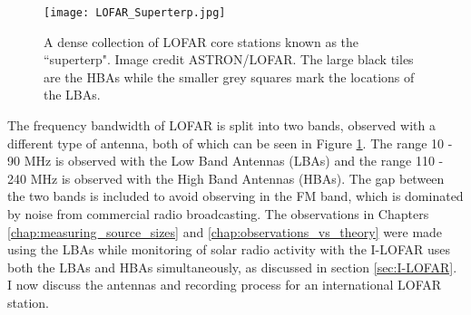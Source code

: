  
\begin{figure}[ht]
\centering
\texttt{[image: LOFAR\_Superterp.jpg]}
\caption[The LOFAR superterp]{A dense collection of LOFAR core stations known as the ``superterp". Image credit ASTRON/LOFAR. The large black tiles are the HBAs while the smaller grey squares mark the locations of the LBAs.}
\label{fig:superterp}
\end{figure}

The frequency bandwidth of LOFAR is split into two bands, observed with a different type of antenna, both of which can be seen in Figure \ref{fig:superterp}. The range 10 - 90 MHz is observed with the Low Band Antennas (LBAs) and the range 110 - 240 MHz is observed with the High Band Antennas (HBAs). The gap between the two bands is included to avoid observing in the FM band, which is dominated by noise from commercial radio broadcasting. The observations in Chapters \ref{chap:measuring_source_sizes} and \ref{chap:observations_vs_theory} were made using the LBAs while monitoring of solar radio activity with the I-LOFAR uses both the LBAs and HBAs simultaneously, as discussed in section \ref{sec:I-LOFAR}. I now discuss the antennas and recording process for an international LOFAR station.
